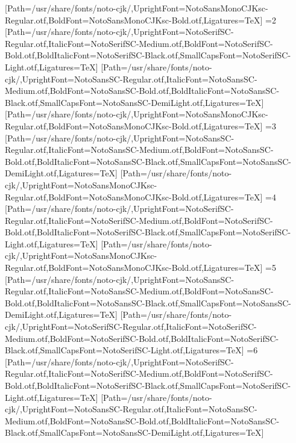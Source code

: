 [Path=/usr/share/fonts/noto-cjk/,UprightFont=NotoSansMonoCJKsc-Regular.otf,BoldFont=NotoSansMonoCJKsc-Bold.otf,Ligatures=TeX]
\else\ifnum\value{CJKFonts}=2
[Path=/usr/share/fonts/noto-cjk/,UprightFont=NotoSerifSC-Regular.otf,ItalicFont=NotoSerifSC-Medium.otf,BoldFont=NotoSerifSC-Bold.otf,BoldItalicFont=NotoSerifSC-Black.otf,SmallCapsFont=NotoSerifSC-Light.otf,Ligatures=TeX]
[Path=/usr/share/fonts/noto-cjk/,UprightFont=NotoSansSC-Regular.otf,ItalicFont=NotoSansSC-Medium.otf,BoldFont=NotoSansSC-Bold.otf,BoldItalicFont=NotoSansSC-Black.otf,SmallCapsFont=NotoSansSC-DemiLight.otf,Ligatures=TeX]
[Path=/usr/share/fonts/noto-cjk/,UprightFont=NotoSansMonoCJKsc-Regular.otf,BoldFont=NotoSansMonoCJKsc-Bold.otf,Ligatures=TeX]
\else\ifnum\value{CJKFonts}=3
[Path=/usr/share/fonts/noto-cjk/,UprightFont=NotoSansSC-Regular.otf,ItalicFont=NotoSansSC-Medium.otf,BoldFont=NotoSansSC-Bold.otf,BoldItalicFont=NotoSansSC-Black.otf,SmallCapsFont=NotoSansSC-DemiLight.otf,Ligatures=TeX]
[Path=/usr/share/fonts/noto-cjk/,UprightFont=NotoSansMonoCJKsc-Regular.otf,BoldFont=NotoSansMonoCJKsc-Bold.otf,Ligatures=TeX]
\else\ifnum\value{CJKFonts}=4
[Path=/usr/share/fonts/noto-cjk/,UprightFont=NotoSerifSC-Regular.otf,ItalicFont=NotoSerifSC-Medium.otf,BoldFont=NotoSerifSC-Bold.otf,BoldItalicFont=NotoSerifSC-Black.otf,SmallCapsFont=NotoSerifSC-Light.otf,Ligatures=TeX]
[Path=/usr/share/fonts/noto-cjk/,UprightFont=NotoSansMonoCJKsc-Regular.otf,BoldFont=NotoSansMonoCJKsc-Bold.otf,Ligatures=TeX]
\else\ifnum\value{CJKFonts}=5
[Path=/usr/share/fonts/noto-cjk/,UprightFont=NotoSansSC-Regular.otf,ItalicFont=NotoSansSC-Medium.otf,BoldFont=NotoSansSC-Bold.otf,BoldItalicFont=NotoSansSC-Black.otf,SmallCapsFont=NotoSansSC-DemiLight.otf,Ligatures=TeX]
[Path=/usr/share/fonts/noto-cjk/,UprightFont=NotoSerifSC-Regular.otf,ItalicFont=NotoSerifSC-Medium.otf,BoldFont=NotoSerifSC-Bold.otf,BoldItalicFont=NotoSerifSC-Black.otf,SmallCapsFont=NotoSerifSC-Light.otf,Ligatures=TeX]
\else\ifnum\value{CJKFonts}=6
[Path=/usr/share/fonts/noto-cjk/,UprightFont=NotoSerifSC-Regular.otf,ItalicFont=NotoSerifSC-Medium.otf,BoldFont=NotoSerifSC-Bold.otf,BoldItalicFont=NotoSerifSC-Black.otf,SmallCapsFont=NotoSerifSC-Light.otf,Ligatures=TeX]
[Path=/usr/share/fonts/noto-cjk/,UprightFont=NotoSansSC-Regular.otf,ItalicFont=NotoSansSC-Medium.otf,BoldFont=NotoSansSC-Bold.otf,BoldItalicFont=NotoSansSC-Black.otf,SmallCapsFont=NotoSansSC-DemiLight.otf,Ligatures=TeX]
